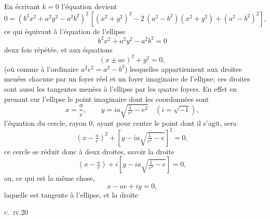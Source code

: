 \documentclass[11pt]{article}
\begin{document}
En écrivant $k = 0$ l'équation devient
\[
0 = (b^2x^2 + a^2y^2 - a^2b^2)^2\,[(x^2 + y^2)^2 - 2\,(a^2 - b^2)(x^2 + y^2) + (a^2 - b^2)^2],
\]
ce qui équivaut à l'équation de l'ellipse
\[
b^2x^2 + a^2y^2 - a^2b^2 = 0
\]
deux fois répétée, et aux équations
\[
(x \pm ae)^2 + y^2 = 0,
\]
(où comme à l'ordinaire $a^2e^2 = a^2 - b^2$) lesquelles appartiennent aux droites menées chacune par un foyer réel et un foyer imaginaire de l'ellipse; ces droites sont aussi les tangentes menées à l'ellipse par les quatre foyers. En effet en prenant sur l'ellipse le point imaginaire dont les coordonnées sont
\[
x = \frac{a}{e},\qquad y = ia\sqrt{\tfrac{1}{e^2}-e^2}\quad (i = \sqrt{-1}),
\]
l'équation du cercle, rayon $0$, ayant pour centre le point dont il s'agit, sera
\[
\left(x - \tfrac{a}{e}\right)^2 + \left[y - ia\sqrt{\tfrac{1}{e^2}-e}\right]^2 = 0,
\]
ce cercle se réduit donc à deux droites, savoir la droite
\[
\left(x - \tfrac{a}{e}\right) + i\left[y - ia\sqrt{\tfrac{1}{e^2}-e}\right] = 0,
\]
ou, ce qui est la même chose,
\[
x - ae + iy = 0,
\]
laquelle est tangente à l'ellipse, et la droite

\hfill\textsc{c.~iv.}\hfill 20
\end{document}
